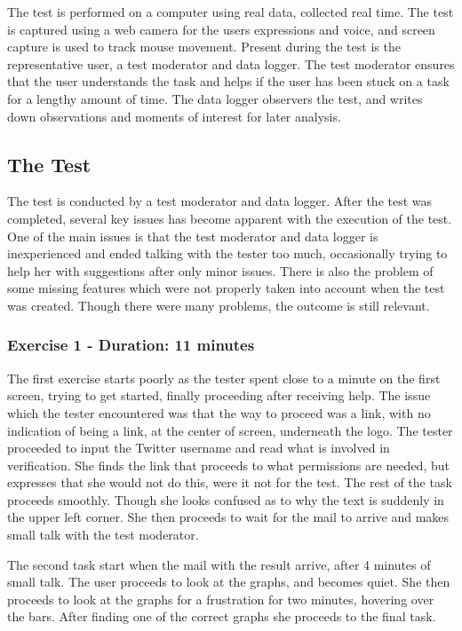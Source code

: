 The test is performed on a computer using real data, collected real time. The
test is captured using a web camera for the users expressions and voice, and
screen capture is used to track mouse movement. Present during the test is the
representative user, a test moderator and data logger. The test moderator
ensures that the user understands the task and helps if the user has been stuck
on a task for a lengthy amount of time. The data logger observers the test,
and writes down observations and moments of interest for later analysis.

\subsection{The Test}\label{subsec:UXTest}
The test is conducted by a test moderator and data logger. After the test was
completed, several key issues has become apparent with the execution of the
test. One of the main issues is that the test moderator and data logger is
inexperienced and ended talking with the tester too much, occasionally trying
to help her with suggestions after only minor issues. There is also the problem
of some missing features which were not properly taken into account when the
test was created. Though there were many problems, the outcome is still
relevant.

\subsubsection{Exercise 1 - Duration: 11 minutes}
The first exercise starts poorly as the tester spent close to a minute on the
first screen, trying to get started, finally proceeding after receiving help.
The issue which the tester encountered was that the way to proceed was a link,
with no indication of being a link, at the center of screen, underneath the
logo. The tester proceeded to input the Twitter username and read what is
involved in verification. She finds the link that proceeds to what permissions
are needed, but expresses that she would not do this, were it not for the test.
The rest of the task proceeds smoothly. Though she looks confused as to why the
text is suddenly in the upper left corner. She then proceeds to wait for the
mail to arrive and makes small talk with the test moderator.\nl

The second task start when the mail with the result arrive, after 4 minutes
of small talk. The user proceeds to look at the graphs, and becomes quiet. She
then proceeds to look at the graphs for a frustration for two minutes, hovering
over the bars. After finding one of the correct graphs she proceeds to the final
task.\nl

